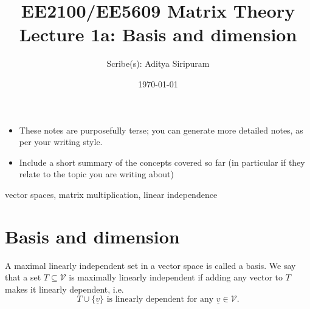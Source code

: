 \documentclass{tufte-handout}
\title[Lecture 1a]{\large EE2100/EE5609 Matrix Theory \\ \LARGE Lecture 1a: Basis and dimension}
\author[Aditya S]{Scribe(s): Aditya Siripuram}
\date{\today}  %
\theoremstyle{remark}
\renewcommand{\vec}[1]{\underline{#1}}
\begin{document}
\maketitle%

\begin{itemize}
    \item These notes are purposefully terse; you can generate more detailed notes, as per your writing style.
    \item Include a short summary of the concepts covered so far (in particular if they relate to the topic you are writing about)
\end{itemize}
 vector spaces, matrix multiplication, linear independence
\section{Basis and dimension}
A maximal linearly independent set in a vector space is called a basis. We say that a set $T \subseteq \mathcal{V}$ is maximally linearly independent if adding any vector to $T$ makes it linearly dependent, i.e. 
\[
T\cup \{\vec{v}\} \text{ is linearly dependent  for any }\vec{v} \in \mathcal{V}.
\]
\end{document}
